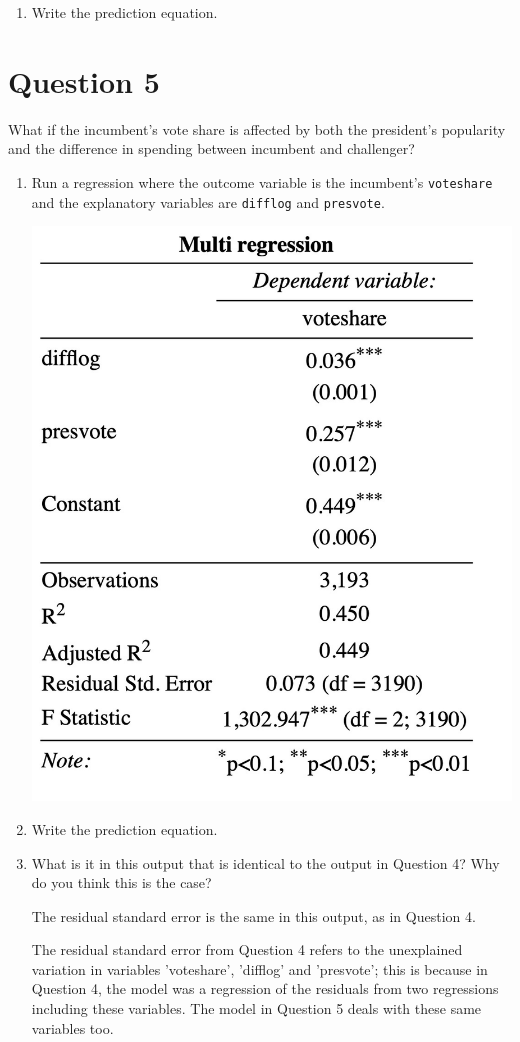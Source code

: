 \documentclass[12pt,letterpaper]{article}
\begin{document}
\begin{enumerate}
		\vspace{2cm}
		\item Write the prediction equation.
			 
	\end{enumerate}
	
	\newpage	

\section*{Question 5}
\noindent What if the incumbent's vote share is affected by both the president's popularity and the difference in spending between incumbent and challenger? 
	\begin{enumerate}
		\item Run a regression where the outcome variable is the incumbent's \texttt{voteshare} and the explanatory variables are \texttt{difflog} and \texttt{presvote}.	
			 
		\includegraphics[width=.8\textwidth]{model_5.jpg}
		\vspace{5cm}
		\item Write the prediction equation.	
			 
		\vspace{.5cm}
		\item What is it in this output that is identical to the output in Question 4? Why do you think this is the case?
	
		\vspace{.5cm}
		The residual standard error is the same in this output, as in Question 4. 
		
		The residual standard error from Question 4 refers to the unexplained variation in variables 'voteshare', 'difflog' and 'presvote'; this is because in Question 4, the model was a regression of the residuals from two regressions including these variables. The model in Question 5 deals with these same variables too. 
	\end{enumerate}
\end{document}

